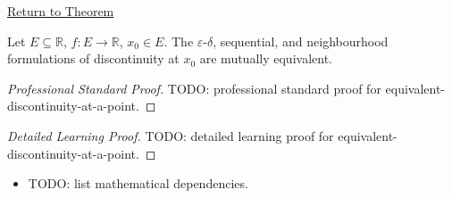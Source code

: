 \newpage
{}
\label{prf:equivalent-discontinuity-at-a-point}

\begin{remark*}[Return]
\hyperref[lem:equivalent-discontinuity-at-a-point]{Return to Theorem}
\end{remark*}

\begin{lemma*}
Let $E \subseteq \mathbb{R}$, $f : E \to \mathbb{R}$, $x_0 \in E$. The $\varepsilon$-$\delta$, sequential, and neighbourhood formulations of discontinuity at $x_0$ are mutually equivalent.
\end{lemma*}

\begin{proof}[Professional Standard Proof]
\LRAProofBodyStart
TODO: professional standard proof for equivalent-discontinuity-at-a-point.
\end{proof}

\begin{proof}[Detailed Learning Proof]
\LRAProofBodyStart
TODO: detailed learning proof for equivalent-discontinuity-at-a-point.
\end{proof}

\begin{remark*}
\end{remark*}

\begin{dependencies}
\begin{itemize}
  \item TODO: list mathematical dependencies.
\end{itemize}
\end{dependencies}

\clearpage
